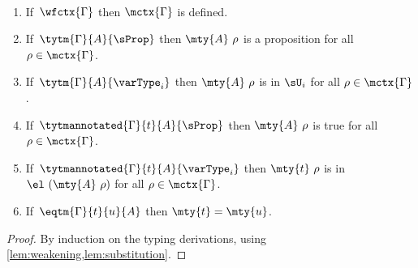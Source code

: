\begin{theorem}
  \
  \begin{enumerate}
    \item If\, \( \wfctx{\Gamma} \) then \( \mctx{\Gamma} \) is defined.
    \item If\, \( \tytm{\Gamma}{A}{\sProp} \) then \( \mty{A}\ \rho \) is a proposition for all \( \rho \in \mctx{\Gamma} \).
    \item If\, \( \tytm{\Gamma}{A}{\varType_i} \) then \( \mty{A}\ \rho \) is in \( \sU_i \) for all \( \rho \in \mctx{\Gamma} \).
    \item If\, \( \tytmannotated{\Gamma}{t}{A}{\sProp} \) then \( \mty{A}\ \rho \) is true for all \( \rho \in \mctx{\Gamma} \).
    \item If\, \( \tytmannotated{\Gamma}{t}{A}{\varType_i} \) then \( \mty{t}\ \rho \) is in \( \el\ (\mty{A}\ \rho) \) for all \( \rho \in \mctx{\Gamma} \).
    \item If\, \( \eqtm{\Gamma}{t}{u}{A} \) then \( \mty{t} = \mty{u} \).
  \end{enumerate}
\end{theorem}
\begin{proof}
  By induction on the typing derivations, using \cref{lem:weakening,lem:substitution}.
\end{proof}


